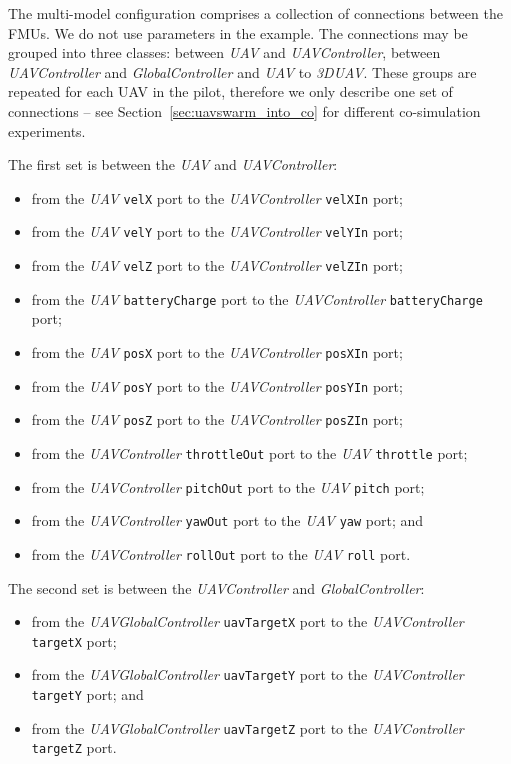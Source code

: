 The multi-model configuration comprises a collection of connections between the FMUs. We do not use  parameters in the example. The connections may be grouped into three classes: between \emph{UAV} and \emph{UAVController}, between \emph{UAVController} and \emph{GlobalController} and \emph{UAV} to \emph{3DUAV}. These groups are repeated for each UAV in the pilot, therefore we only describe one set of connections -- see Section~\ref{sec:uavswarm_into_co} for different co-simulation experiments.

The first set is between the \emph{UAV} and \emph{UAVController}:
 \begin{itemize}
  \item from the \emph{UAV} \texttt{velX} port to the \emph{UAVController} \texttt{velXIn} port;
  \item from the \emph{UAV} \texttt{velY} port to the \emph{UAVController} \texttt{velYIn} port; 
  \item from the \emph{UAV} \texttt{velZ} port to the \emph{UAVController} \texttt{velZIn} port; 
  \item from the \emph{UAV} \texttt{batteryCharge} port to the \emph{UAVController} \texttt{batteryCharge} port;
  \item from the \emph{UAV} \texttt{posX} port to the \emph{UAVController} \texttt{posXIn} port;
  \item from the \emph{UAV} \texttt{posY} port to the \emph{UAVController} \texttt{posYIn} port; 
  \item from the \emph{UAV} \texttt{posZ} port to the \emph{UAVController} \texttt{posZIn} port; 
  \item from the \emph{UAVController} \texttt{throttleOut} port to the \emph{UAV} \texttt{throttle} port;
  \item from the \emph{UAVController} \texttt{pitchOut} port to the \emph{UAV} \texttt{pitch} port; 
  \item from the \emph{UAVController} \texttt{yawOut} port to the \emph{UAV} \texttt{yaw} port; and
  \item from the \emph{UAVController} \texttt{rollOut} port to the \emph{UAV} \texttt{roll} port.
\end{itemize}
  
The second set is between the \emph{UAVController} and \emph{GlobalController}:
\begin{itemize}
  \item from the \emph{UAVGlobalController} \texttt{uavTargetX} port to the \emph{UAVController} \texttt{targetX} port;
  \item from the \emph{UAVGlobalController} \texttt{uavTargetY} port to the \emph{UAVController} \texttt{targetY} port; and 
  \item from the \emph{UAVGlobalController} \texttt{uavTargetZ} port to the \emph{UAVController} \texttt{targetZ} port.
 \end{itemize}

